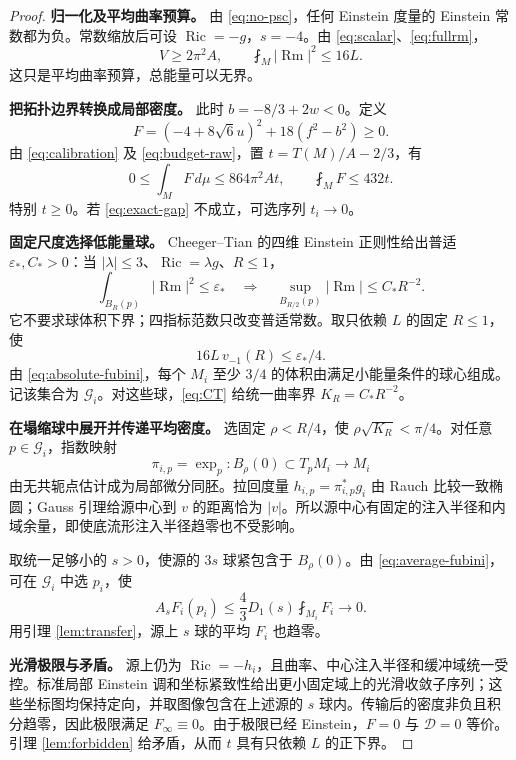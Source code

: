 \documentclass[UTF8,fontset=fandol,zihao=-4]{ctexart}
\theoremstyle{cn}
\DeclareMathOperator{\Ric}{Ric}
\DeclareMathOperator{\Rm}{Rm}
\newcommand{\dd}{\,d\mu}
\newcommand{\av}{\fint}
\newcommand{\Dcal}{\mathcal D}
\numberwithin{equation}{section}
\begin{document}
\begin{proof}
\textbf{归一化及平均曲率预算。}
由 \eqref{eq:no-psc}，任何 Einstein 度量的 Einstein 常数都为负。常数缩放后可设 $\Ric=-g$，$s=-4$。由 \eqref{eq:scalar}、\eqref{eq:fullrm}，
\begin{equation}\label{eq:exact-curv-budget}
V\ge2\pi^2A,\qquad \av_M|\Rm|^2\le16L.
\end{equation}
这只是平均曲率预算，总能量可以无界。

\textbf{把拓扑边界转换成局部密度。}
此时 $b=-8/3+2w<0$。定义
\[
F=(-4+8\sqrt6u)^2+18(f^2-b^2)\ge0.
\]
由 \eqref{eq:calibration} 及 \eqref{eq:budget-raw}，置 $t=T(M)/A-2/3$，有
\begin{equation}\label{eq:exact-F}
0\le\int_MF\dd\le864\pi^2At,\qquad \av_MF\le432t.
\end{equation}
特别 $t\ge0$。若 \eqref{eq:exact-gap} 不成立，可选序列 $t_i\to0$。

\textbf{固定尺度选择低能量球。}
Cheeger--Tian 的四维 Einstein 正则性\cite{ct,gejiang}给出普适 $\varepsilon_*,C_*>0$：当 $|\lambda|\le3$、$\Ric=\lambda g$、$R\le1$，
\begin{equation}\label{eq:CT}
\int_{B_R(p)}|\Rm|^2\le\varepsilon_*
\quad\Longrightarrow\quad
\sup_{B_{R/2}(p)}|\Rm|\le C_*R^{-2}.
\end{equation}
它不要求球体积下界；四指标范数只改变普适常数。取只依赖 $L$ 的固定 $R\le1$，使
\[
16L\,v_{-1}(R)\le\varepsilon_*/4.
\]
由 \eqref{eq:absolute-fubini}，每个 $M_i$ 至少 $3/4$ 的体积由满足小能量条件的球心组成。记该集合为 $\mathcal G_i$。对这些球，\eqref{eq:CT} 给统一曲率界 $K_R=C_*R^{-2}$。

\textbf{在塌缩球中展开并传递平均密度。}
选固定 $\rho<R/4$，使 $\rho\sqrt{K_R}<\pi/4$。对任意 $p\in\mathcal G_i$，指数映射
\[
\pi_{i,p}=\exp_p:B_\rho(0)\subset T_pM_i\longrightarrow M_i
\]
由无共轭点估计成为局部微分同胚。拉回度量 $h_{i,p}=\pi_{i,p}^*g_i$ 由 Rauch 比较一致椭圆；Gauss 引理给源中心到 $v$ 的距离恰为 $|v|$。所以源中心有固定的注入半径和内域余量，即使底流形注入半径趋零也不受影响。

取统一足够小的 $s>0$，使源的 $3s$ 球紧包含于 $B_\rho(0)$。由 \eqref{eq:average-fubini}，可在 $\mathcal G_i$ 中选 $p_i$，使
\[
A_sF_i(p_i)\le\frac43D_1(s)\av_{M_i}F_i\longrightarrow0.
\]
用引理 \ref{lem:transfer}，源上 $s$ 球的平均 $F_i$ 也趋零。

\textbf{光滑极限与矛盾。}
源上仍为 $\Ric=-h_i$，且曲率、中心注入半径和缓冲域统一受控。标准局部 Einstein 调和坐标紧致性给出更小固定域上的光滑收敛子序列；这些坐标图均保持定向，并取图像包含在上述源的 $s$ 球内。传输后的密度非负且积分趋零，因此极限满足 $F_\infty\equiv0$。由于极限已经 Einstein，$F=0$ 与 $\Dcal=0$ 等价。引理 \ref{lem:forbidden} 给矛盾，从而 $t$ 具有只依赖 $L$ 的正下界。
\end{proof}
\end{document}
